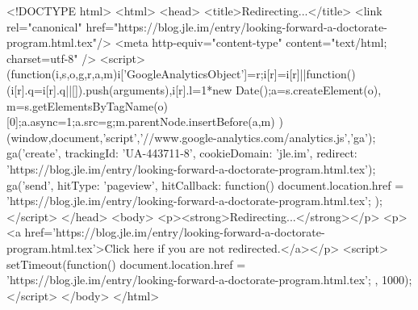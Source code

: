 <!DOCTYPE html>
<html>
<head>
<title>Redirecting...</title>
<link rel="canonical" href="https://blog.jle.im/entry/looking-forward-a-doctorate-program.html.tex"/>
<meta http-equiv="content-type" content="text/html; charset=utf-8" />
<script>
(function(i,s,o,g,r,a,m){i['GoogleAnalyticsObject']=r;i[r]=i[r]||function(){
(i[r].q=i[r].q||[]).push(arguments)},i[r].l=1*new Date();a=s.createElement(o),
m=s.getElementsByTagName(o)[0];a.async=1;a.src=g;m.parentNode.insertBefore(a,m)
})(window,document,'script','//www.google-analytics.com/analytics.js','ga');
ga('create', { trackingId: 'UA-443711-8', cookieDomain: 'jle.im', redirect: 'https://blog.jle.im/entry/looking-forward-a-doctorate-program.html.tex'});
ga('send', { hitType: 'pageview', hitCallback: function() { document.location.href = 'https://blog.jle.im/entry/looking-forward-a-doctorate-program.html.tex'; } });
</script>
</head>
<body>
  <p><strong>Redirecting...</strong></p>
  <p><a href='https://blog.jle.im/entry/looking-forward-a-doctorate-program.html.tex'>Click here if you are not redirected.</a></p>
  <script>
    setTimeout(function() { document.location.href = 'https://blog.jle.im/entry/looking-forward-a-doctorate-program.html.tex'; }, 1000);
  </script>
</body>
</html>
